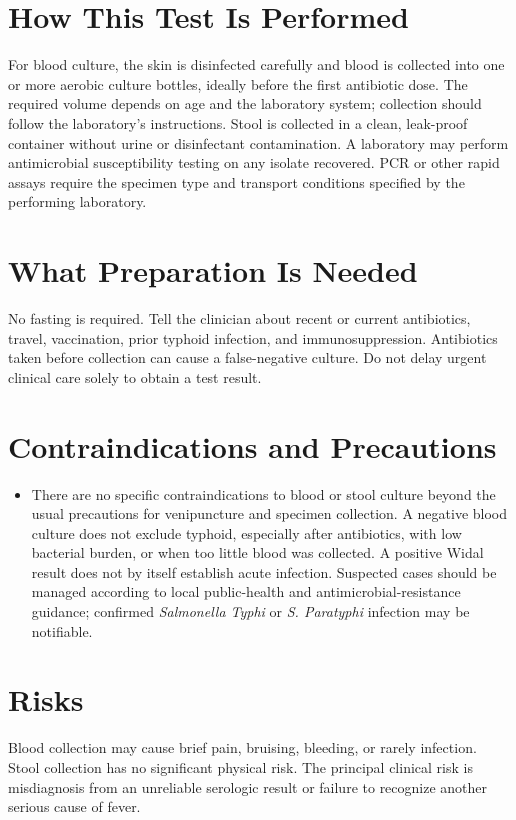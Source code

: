 \section*{How This Test Is Performed}
For blood culture, the skin is disinfected carefully and blood is collected into one or more aerobic culture bottles, ideally before the first antibiotic dose. The required volume depends on age and the laboratory system; collection should follow the laboratory's instructions. Stool is collected in a clean, leak-proof container without urine or disinfectant contamination. A laboratory may perform antimicrobial susceptibility testing on any isolate recovered. PCR or other rapid assays require the specimen type and transport conditions specified by the performing laboratory.

\section*{What Preparation Is Needed}
No fasting is required. Tell the clinician about recent or current antibiotics, travel, vaccination, prior typhoid infection, and immunosuppression. Antibiotics taken before collection can cause a false-negative culture. Do not delay urgent clinical care solely to obtain a test result.

\section*{Contraindications and Precautions}
\begin{itemize}
  \item There are no specific contraindications to blood or stool culture beyond the usual precautions for venipuncture and specimen collection. A negative blood culture does not exclude typhoid, especially after antibiotics, with low bacterial burden, or when too little blood was collected. A positive Widal result does not by itself establish acute infection. Suspected cases should be managed according to local public-health and antimicrobial-resistance guidance; confirmed \textit{Salmonella Typhi} or \textit{S. Paratyphi} infection may be notifiable.
\end{itemize}
\section*{Risks}
Blood collection may cause brief pain, bruising, bleeding, or rarely infection. Stool collection has no significant physical risk. The principal clinical risk is misdiagnosis from an unreliable serologic result or failure to recognize another serious cause of fever.

